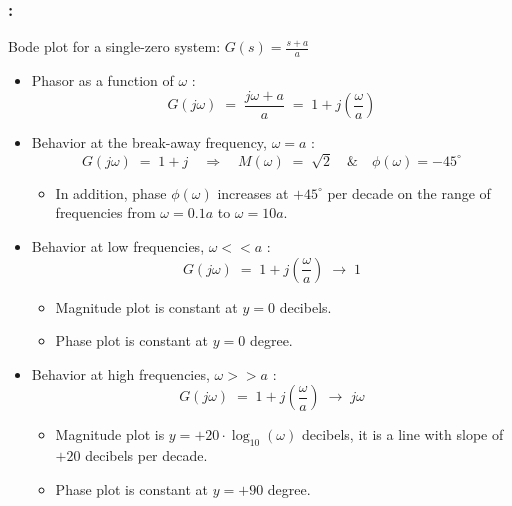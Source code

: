 \documentclass[ 10pt, xcolor = dvipsnames]{beamer}
\begin{document}
\begin{frame}[allowframebreaks]
\frametitle{\insertsection: \insertsubsection}

Bode plot for a single-zero system: $\displaystyle G(s) = \frac{s+a}{a}$
\begin{itemize}
\item Phasor as a function of $\omega$ : 
\[
G(j\omega) \; = \; \frac{j\omega + a}{a}
\; = \; 1 + j \left( \frac{\omega}{a} \right)
\]
\item Behavior at the break-away frequency, \ie $\omega = a$ :
\[
G(j\omega) \; = \; 1 + j \quad \Longrightarrow \quad
M(\omega) \; = \; \sqrt{2} \quad \& \quad
\phi(\omega) = -45^{\circ}
\]
\fullcut
\begin{itemize}
\item In addition, phase $\phi(\omega)$ increases at $+45^{\circ}$ per decade on the range of frequencies from $\omega = 0.1 a$ to $\omega = 10 a$. 
\end{itemize}
\framebreak

\item Behavior at low frequencies, \ie $\omega << a$ :
\[
G(j\omega) \; = \;
1 + j \left( \frac{\omega}{a} \right) \; \longrightarrow \; 1
\]
\fullcut
\begin{itemize}
\item Magnitude plot is constant at $y = 0$ decibels. 
\item Phase plot is constant at $y = 0$ degree. 
\end{itemize}
\halfskip
\item Behavior at high frequencies, \ie $\omega >> a$ :
\[
G(j\omega) \; = \;
1 + j \left( \frac{\omega}{a} \right) \; \longrightarrow \; j\omega
\]
\fullcut
\begin{itemize}
\item Magnitude plot is $y = +20 \cdot \log_{10}(\omega)$ decibels, \ie it is a line with slope of $+20$ decibels per decade. 
\item Phase plot is constant at $y = +90$ degree. 
\end{itemize}

\end{itemize}

\end{frame}
\end{document}
